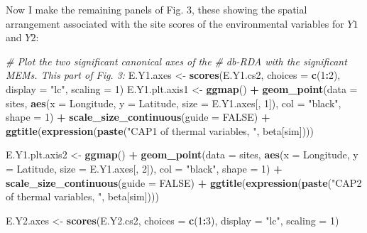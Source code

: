 \documentclass[10pt,A4,]{article}
\newenvironment{Shaded}{\begin{snugshade}}{\end{snugshade}}
\newcommand{\KeywordTok}[1]{\textcolor[rgb]{0.13,0.29,0.53}{\textbf{#1}}}
\newcommand{\DataTypeTok}[1]{\textcolor[rgb]{0.13,0.29,0.53}{#1}}
\newcommand{\DecValTok}[1]{\textcolor[rgb]{0.00,0.00,0.81}{#1}}
\newcommand{\StringTok}[1]{\textcolor[rgb]{0.31,0.60,0.02}{#1}}
\newcommand{\CommentTok}[1]{\textcolor[rgb]{0.56,0.35,0.01}{\textit{#1}}}
\newcommand{\OtherTok}[1]{\textcolor[rgb]{0.56,0.35,0.01}{#1}}
\newcommand{\OperatorTok}[1]{\textcolor[rgb]{0.81,0.36,0.00}{\textbf{#1}}}
\newcommand{\NormalTok}[1]{#1}
\begin{document}
Now I make the remaining panels of Fig. 3, these showing the spatial
arrangement associated with the site scores of the environmental
variables for \(Y1\) and \(Y2\):

\begin{Shaded}
\begin{Highlighting}[]
\CommentTok{# Plot the two significant canonical axes of the }
\CommentTok{# db-RDA with the significant MEMs. This part of Fig. 3:}
\NormalTok{E.Y1.axes <-}\StringTok{ }\KeywordTok{scores}\NormalTok{(E.Y1.cs2, }\DataTypeTok{choices =} \KeywordTok{c}\NormalTok{(}\DecValTok{1}\OperatorTok{:}\DecValTok{2}\NormalTok{),}
                   \DataTypeTok{display =} \StringTok{"lc"}\NormalTok{, }\DataTypeTok{scaling =} \DecValTok{1}\NormalTok{)}
\NormalTok{E.Y1.plt.axis1 <-}\StringTok{ }\KeywordTok{ggmap}\NormalTok{() }\OperatorTok{+}
\StringTok{  }\KeywordTok{geom_point}\NormalTok{(}\DataTypeTok{data =}\NormalTok{ sites, }\KeywordTok{aes}\NormalTok{(}\DataTypeTok{x =}\NormalTok{ Longitude, }\DataTypeTok{y =}\NormalTok{ Latitude, }\DataTypeTok{size =}\NormalTok{ E.Y1.axes[, }\DecValTok{1}\NormalTok{]),}
             \DataTypeTok{col =} \StringTok{"black"}\NormalTok{, }\DataTypeTok{shape =} \DecValTok{1}\NormalTok{) }\OperatorTok{+}
\StringTok{  }\KeywordTok{scale_size_continuous}\NormalTok{(}\DataTypeTok{guide =} \OtherTok{FALSE}\NormalTok{) }\OperatorTok{+}
\StringTok{  }\KeywordTok{ggtitle}\NormalTok{(}\KeywordTok{expression}\NormalTok{(}\KeywordTok{paste}\NormalTok{(}\StringTok{"CAP1 of thermal variables, "}\NormalTok{, beta[sim])))}

\NormalTok{E.Y1.plt.axis2 <-}\StringTok{ }\KeywordTok{ggmap}\NormalTok{() }\OperatorTok{+}
\StringTok{  }\KeywordTok{geom_point}\NormalTok{(}\DataTypeTok{data =}\NormalTok{ sites, }\KeywordTok{aes}\NormalTok{(}\DataTypeTok{x =}\NormalTok{ Longitude, }\DataTypeTok{y =}\NormalTok{ Latitude, }\DataTypeTok{size =}\NormalTok{ E.Y1.axes[, }\DecValTok{2}\NormalTok{]),}
             \DataTypeTok{col =} \StringTok{"black"}\NormalTok{, }\DataTypeTok{shape =} \DecValTok{1}\NormalTok{) }\OperatorTok{+}
\StringTok{  }\KeywordTok{scale_size_continuous}\NormalTok{(}\DataTypeTok{guide =} \OtherTok{FALSE}\NormalTok{) }\OperatorTok{+}
\StringTok{  }\KeywordTok{ggtitle}\NormalTok{(}\KeywordTok{expression}\NormalTok{(}\KeywordTok{paste}\NormalTok{(}\StringTok{"CAP2 of thermal variables, "}\NormalTok{, beta[sim])))}

\NormalTok{E.Y2.axes <-}\StringTok{ }\KeywordTok{scores}\NormalTok{(E.Y2.cs2, }\DataTypeTok{choices =} \KeywordTok{c}\NormalTok{(}\DecValTok{1}\OperatorTok{:}\DecValTok{3}\NormalTok{),}
                    \DataTypeTok{display =} \StringTok{"lc"}\NormalTok{, }\DataTypeTok{scaling =} \DecValTok{1}\NormalTok{)}


\end{Highlighting}
\end{Shaded}
\end{document}
